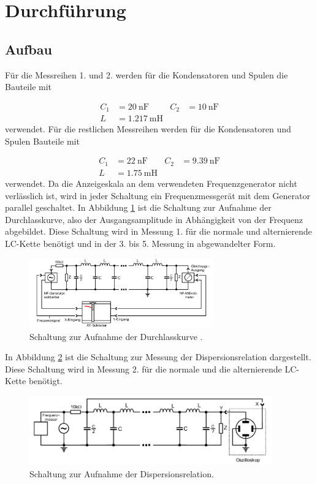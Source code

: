  \section{Durchführung}
\label{sec:Durchführung}


\subsection{Aufbau}

Für die Messreihen 1. und 2. werden für die Kondensatoren und Spulen die
Bauteile mit

\begin{align}
  C_1 & = \SI{20}{\nano\F} & C_2 & = \SI{10}{\nano\F} \\
  L & = \SI{1.217}{\milli\henry}
\end{align}
verwendet. Für die restlichen Messreihen werden für die Kondensatoren und Spulen
Bauteile mit

\begin{align}
  C_1 & = \SI{22}{\nano\F} & C_2 & = \SI{9.39}{\nano\F} \\
  L & = \SI{1.75}{\milli\henry}
\end{align}
verwendet.
Da die Anzeigeskala an dem verwendeten Frequenzgenerator nicht verlässlich ist,
wird in jeder Schaltung ein Frequenzmessgerät mit dem Generator parallel
geschaltet.
In Abbildung \ref{fig:DK} ist die Schaltung zur Aufnahme der Durchlasskurve,
also der Ausgangsamplitude in Abhängigkeit von der Frequenz abgebildet.
Diese Schaltung wird in Messung 1. für die normale und
alternierende LC-Kette benötigt und in der 3. bis 5. Messung in abgewandelter
Form.

\begin{figure}
  \centering
  \includegraphics[height=3cm]{DurchlasskurveLCkette.png}
  \caption{Schaltung zur Aufnahme der Durchlasskurve \cite{anleitung}.}
  \label{fig:DK}
\end{figure}

In Abbildung \ref{fig:DR} ist die Schaltung zur Messung der Dispersionsrelation
dargestellt. Diese Schaltung wird in Messung 2. für die normale und die
alternierende LC-Kette benötigt.

\begin{figure}
  \centering
  \includegraphics[height=3cm]{DispersionC1C2.png}
  \caption{Schaltung zur Aufnahme der Dispersionsrelation\cite{anleitung}.}
  \label{fig:DR}
\end{figure}


